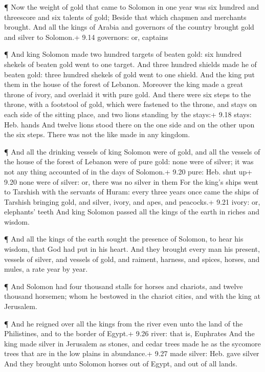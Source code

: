  ¶ Now the weight of gold that came to Solomon in one year
was six hundred and threescore and six talents of gold; 
Beside that which chapmen and merchants brought. And all the kings of
Arabia and governors of the country brought gold and silver to Solomon.+
9.14 governors: or, captains

 ¶ And king Solomon made two hundred targets of beaten
gold: six hundred shekels of beaten gold went to one target.
 And three hundred shields made he of beaten gold: three
hundred shekels of gold went to one shield. And the king put them in the
house of the forest of Lebanon.  Moreover the king made a
great throne of ivory, and overlaid it with pure gold.  And
there were six steps to the throne, with a footstool of gold, which were
fastened to the throne, and stays on each side of the sitting place, and
two lions standing by the stays:+ 9.18 stays: Heb. hands 
And twelve lions stood there on the one side and on the other upon the
six steps. There was not the like made in any kingdom.

 ¶ And all the drinking vessels of king Solomon were of
gold, and all the vessels of the house of the forest of Lebanon were of
pure gold: none were of silver; it was not any thing accounted of in the
days of Solomon.+ 9.20 pure: Heb. shut up+ 9.20 none were of silver: or,
there was no silver in them  For the king's ships went to
Tarshish with the servants of Huram: every three years once came the
ships of Tarshish bringing gold, and silver, ivory, and apes, and
peacocks.+ 9.21 ivory: or, elephants' teeth  And king
Solomon passed all the kings of the earth in riches and wisdom.

 ¶ And all the kings of the earth sought the presence of
Solomon, to hear his wisdom, that God had put in his heart.
 And they brought every man his present, vessels of silver,
and vessels of gold, and raiment, harness, and spices, horses, and
mules, a rate year by year.

 ¶ And Solomon had four thousand stalls for horses and
chariots, and twelve thousand horsemen; whom he bestowed in the chariot
cities, and with the king at Jerusalem.

 ¶ And he reigned over all the kings from the river even
unto the land of the Philistines, and to the border of Egypt.+ 9.26
river: that is, Euphrates  And the king made silver in
Jerusalem as stones, and cedar trees made he as the sycomore trees that
are in the low plains in abundance.+ 9.27 made silver: Heb. gave silver
 And they brought unto Solomon horses out of Egypt, and out
of all lands.

